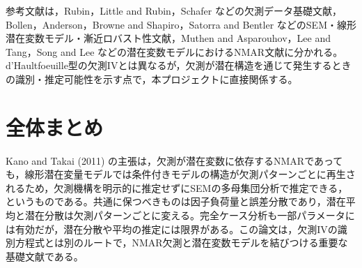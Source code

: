 \documentclass[dvipdfmx,autodetect-engine]{jsarticle}
\begin{document}
参考文献は，Rubin，Little and Rubin，Schafer などの欠測データ基礎文献，Bollen，Anderson，Browne and Shapiro，Satorra and Bentler などのSEM・線形潜在変数モデル・漸近ロバスト性文献，Muthen and Asparouhov，Lee and Tang，Song and Lee などの潜在変数モデルにおけるNMAR文献に分かれる。d'Haultfoeuille型の欠測IVとは異なるが，欠測が潜在構造を通じて発生するときの識別・推定可能性を示す点で，本プロジェクトに直接関係する。

\section*{全体まとめ}

Kano and Takai (2011) の主張は，欠測が潜在変数に依存するNMARであっても，線形潜在変量モデルでは条件付きモデルの構造が欠測パターンごとに再生されるため，欠測機構を明示的に推定せずにSEMの多母集団分析で推定できる，というものである。共通に保つべきものは因子負荷量と誤差分散であり，潜在平均と潜在分散は欠測パターンごとに変える。完全ケース分析も一部パラメータには有効だが，潜在分散や平均の推定には限界がある。この論文は，欠測IVの識別方程式とは別のルートで，NMAR欠測と潜在変数モデルを結びつける重要な基礎文献である。
\end{document}
